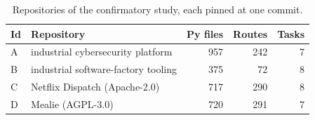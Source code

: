 \begin{table}[t]\centering\footnotesize
\caption{Repositories of the confirmatory study, each pinned at one commit.}
\label{tab:repos}
\begin{tabular}{@{}llrrr@{}}\toprule
Id & Repository & Py files & Routes & Tasks \\\midrule
A & industrial cybersecurity platform & 957 & 242 & 7 \\
B & industrial software-factory tooling & 375 & 72 & 8 \\
C & Netflix Dispatch (Apache-2.0) & 717 & 290 & 8 \\
D & Mealie (AGPL-3.0) & 720 & 291 & 7 \\\bottomrule
\end{tabular}
\end{table}
